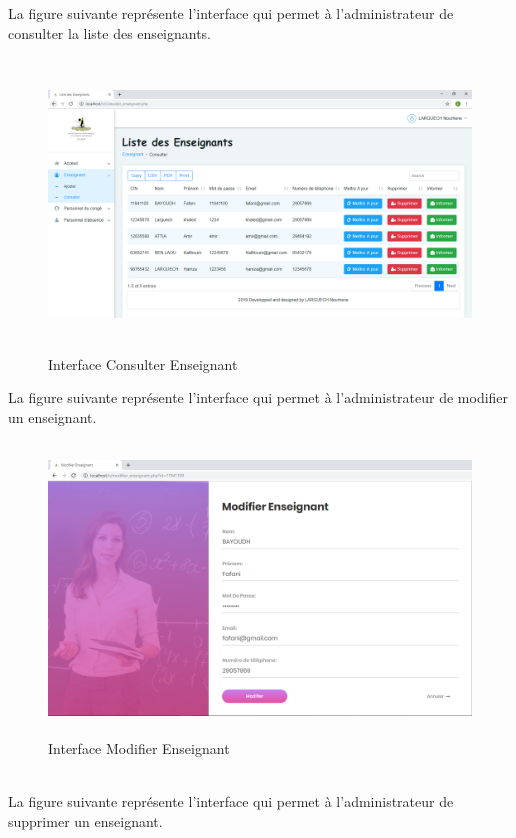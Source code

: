 \documentclass[12 pt ]{report}
\begin{document}
La figure suivante représente l'interface qui permet à l'administrateur de consulter la liste des enseignants.
\begin{figure}[h]
 \begin{center}
\includegraphics[width= 18 cm ,height=  7.75cm]{consulter_enseignant.PNG}
\caption{Interface Consulter Enseignant}

\end{center}
\end{figure}  
\newpage
La figure suivante représente l'interface qui permet à l'administrateur de modifier un enseignant.
\begin{figure}[h]
 \begin{center}
\includegraphics[width= 18 cm ,height=  7.75cm]{modifier_enseignant.PNG}
\caption{Interface Modifier Enseignant}

\end{center}
\end{figure}\\
La figure suivante représente l'interface qui permet à l'administrateur de supprimer  un enseignant.
\end{document}
